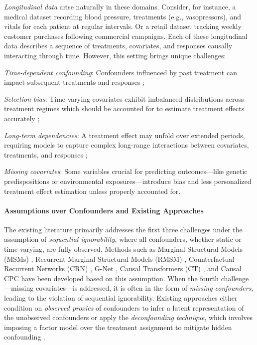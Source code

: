 \documentclass[10pt]{article} %
\begin{document}
\emph{Longitudinal data} arise naturally in these domains. Consider, for instance, a medical dataset recording blood pressure, treatments (e.g., vasopressors), and vitals for each patient at regular intervals. Or a retail dataset tracking weekly customer purchases following commercial campaigns. Each of these longitudinal data describes a sequence of treatments, covariates, and responses causally interacting through time. However, this setting brings unique challenges:
\begin{inparaenum}[(1)]
    \item \emph{Time-dependent confounding}: Confounders influenced by past treatment can impact subsequent treatments and responses \citep{platt2009time};
    \item \emph{Selection bias}: Time-varying covariates exhibit imbalanced distributions across treatment regimes which should be accounted for to estimate treatment effects accurately \citep{robins2000MSM, schisterman2009overadjustment, lim2018RMSM};
    \item \emph{Long-term dependencies}: A treatment effect may unfold over extended periods, requiring models to capture complex long-range interactions between covariates, treatments, and responses \citep{choi2016retain, pham2017predicting};  
    \item \emph{Missing covariates}: Some variables crucial for predicting outcomes—like genetic predispositions or environmental exposures—introduce bias and less personalized treatment effect estimation unless properly accounted for.  
\end{inparaenum}

\paragraph{Assumptions over Confounders and Existing Approaches}  
The existing literature primarily addresses the first three challenges under the assumption of \emph{sequential ignorability}, where all confounders, whether static or time-varying, are fully observed. Methods such as Marginal Structural Models (MSMs) \citep{robins-time-varying-exposures}, Recurrent Marginal Structural Models (RMSM) \citep{lim2018RMSM}, Counterfactual Recurrent Networks (CRN) \citep{bica2020estimatingCRN}, G-Net \citep{Li2021GNetAR}, Causal Transformers (CT) \citep{Melnychuk2022CausalTF}, and Causal CPC \citep{bouchattaoui2024CausalCPC} have been developed based on this assumption. When the fourth challenge—missing covariates—is addressed, it is often in the form of \emph{missing confounders}, leading to the violation of sequential ignorability. Existing approaches either condition on \emph{observed proxies} of confounders to infer a latent representation of the unobserved confounders \citep{MeasbiasproxyConf, MiaoProxyUnmeasuredConf2016, louizos2017causalproxyconf, LuChengCMAproxynConf20121} or apply the \emph{deconfounding technique}, which involves imposing a factor model over the treatment assignment to mitigate hidden confounding \citep{lopezmultipletreatments, ranganath2018multiple, wang2019blessings, zhang2019medicalDeconf, Bica2020TimeSDecounf, hatt2024sequential}.  
\end{document}
